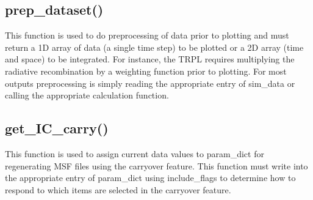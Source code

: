 \documentclass[11pt,letterpaper,titlepage]{article}
\begin{document}
		\subsection{prep\_dataset()}
		\par This function is used to do preprocessing of data prior to plotting and must return a 1D array of data (a single time step) to be plotted or a 2D array (time and space) to be integrated. For instance, the TRPL requires multiplying the radiative recombination by a weighting function prior to plotting. For most outputs preprocessing is simply reading the appropriate entry of sim\_data or calling the appropriate calculation function.
		
		\subsection{get\_IC\_carry()}
		\par This function is used to assign current data values to param\_dict for regenerating MSF files using the carryover feature. This function must write into the appropriate entry of param\_dict using include\_flags to determine how to respond to which items are selected in the carryover feature.
\end{document}
